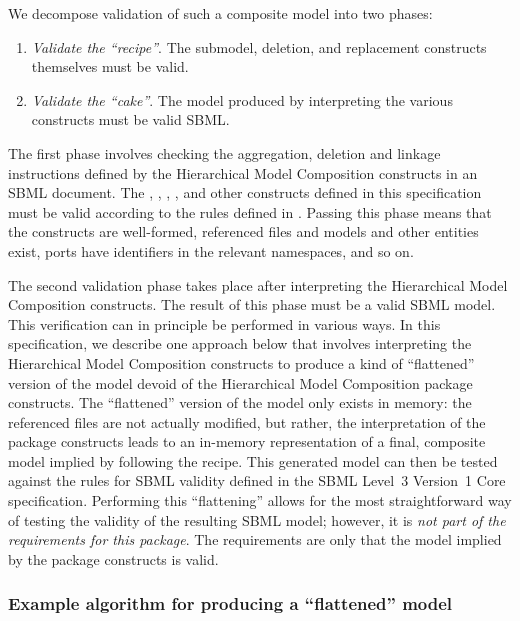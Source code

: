 We decompose validation of such a composite model into two phases:

\begin{enumerate}\setlength{\parskip}{0ex}

\item \emph{Validate the ``recipe''}. The submodel, deletion, and replacement constructs themselves must be valid.

\item \emph{Validate the ``cake''}. The model produced by interpreting the various constructs must be valid SBML.

\end{enumerate}

The first phase involves checking the aggregation, deletion and linkage instructions defined by the Hierarchical Model Composition constructs in an SBML document. The \Submodel, \Port, \Deletion, \ReplacedElement, \ReplacedBy and other constructs defined in this specification must be valid according to the rules defined in . Passing this phase means that the constructs are well-formed, referenced files and models and other entities exist, ports have identifiers in the relevant namespaces, and so on.

The second validation phase takes place after interpreting the Hierarchical Model Composition constructs. The result of this phase must be a valid SBML model. This verification can in principle be performed in various ways. In this specification, we describe one approach below that involves interpreting the Hierarchical Model Composition constructs to produce a kind of ``flattened'' version of the model devoid of the Hierarchical Model Composition package constructs. The ``flattened'' version of the model only exists in memory: the referenced files are not actually modified, but rather, the interpretation of the package constructs leads to an in-memory representation of a final, composite model implied by following the recipe. This generated model can then be tested against the rules for SBML validity defined in the SBML Level~3 Version~1 Core specification. Performing this ``flattening'' allows for the most straightforward way of testing the validity of the resulting SBML model; however, it is \emph{not part of the requirements for this package}. The requirements are only that the model implied by the package constructs is valid.


\subsubsection{Example algorithm for producing a ``flattened'' model}

